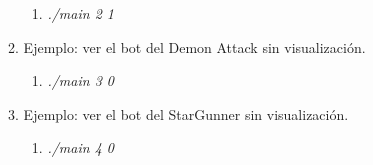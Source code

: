 \begin{enumerate}
\begin{enumerate}
\begin{enumerate}
            \item \textit{./main 2 1}
        \end{enumerate}
        \item Ejemplo: ver el bot del Demon Attack sin visualización.
        \begin{enumerate}
            \item \textit{./main 3 0}
        \end{enumerate}
        \item Ejemplo: ver el bot del StarGunner sin visualización.
        \begin{enumerate}
            \item \textit{./main 4 0}
        \end{enumerate}
    \end{enumerate}
\end{enumerate}

\newpage